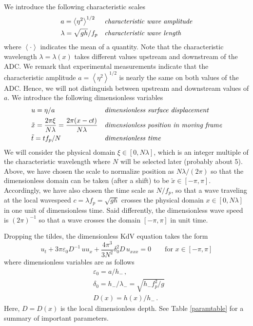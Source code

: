 \documentclass[11pt]{article}
\newcommand{\mean}[1]{\left< #1 \right>}
\newcommand{\eps}{\varepsilon}
\newcommand{\depth}{h}
\newcommand{\dup}{\depth_{-}}
\newcommand{\freqp}{f_p}
\newcommand{\lam}{\lambda}
\newcommand{\lamup}{\lam_{-}}
\newcommand{\lamfac}{N}
\newcommand{\amp}{a}
\newcommand{\epsup}{\eps_0}
\newcommand{\delup}{\delta_0}
\newcommand{\drat}{D}
\begin{document}
We introduce the following characteristic scales
\begin{align}
\label{ampdefn}
&\amp = \mean{\eta^2}^{1/2} 
&&\mbox{\em characteristic wave amplitude} \\
\label{lamdefn}
&\lam = \sqrt{g \depth} / \freqp
&&\mbox{\em characteristic wave length}
\end{align}
where $\mean{\cdot}$ indicates the mean of a quantity. Note that the characteristic wavelength $\lam = \lam(x)$ takes different values upstream and downstream of the ADC. We remark that experimental measurements indicate that the characteristic amplitude $\amp = \mean{\eta^2}^{1/2}$ is nearly the same on both values of the ADC. Hence, we will not distinguish between upstream and downstream values of $\amp$.
We introduce the following dimensionless variables
\begin{align}
&u = \eta/\amp
&&\mbox{\em dimensionless surface displacement} \\
&\tilde{x} = \frac{2 \pi \xi}{\lamfac \lam} = \frac{2 \pi (x-ct)}{\lamfac \lam}
&&\mbox{\em dimensionless position in moving frame} \\
& \tilde{t} = t \freqp / \lamfac
&&\mbox{\em dimensionless time} \\
\end{align}
We will consider the physical domain $\xi \in [0, \lamfac \lam]$, which is an integer multiple of the characteristic wavelength where $\lamfac$ will be selected later (probably about 5). Above, we have chosen the scale to normalize position as $\lamfac \lam/(2\pi)$ so that the dimensionless domain can be taken (after a shift) to be $\tilde{x} \in [-\pi,\pi]$. Accordingly, we have also chosen the time scale as $\lamfac/\freqp$, so that a wave traveling at the local wavespeed $c = \lam \freqp = \sqrt{g \depth}$ crosses the physical domain $x \in [0, \lamfac \lam]$ in one unit of dimensionless time. Said differently, the dimensionless wave speed is $(2 \pi)^{-1}$ so that a wave crosses the domain $[-\pi,\pi]$ in unit time.

Dropping the tildes, the dimensionless KdV equation takes the form
\begin{equation}
\label{dimlessKdV}
u_t + {3 \pi} \epsup \drat^{-1} \, u u_x + \frac{4 \pi^3}{3 \lamfac^2} \delup^2 \drat \, u_{xxx} = 0
\qquad \text{for } x \in [-\pi,\pi]
\end{equation}
where dimensionless variables are as follows
\begin{align}
&\epsup = \amp/\dup \, , \\
&\delup = \dup/\lamup = \sqrt{\dup \freqp^2/g} \, \\
&\drat(x) = {\depth(x)}/{\dup} \, .
\end{align}
Here, $\drat = \drat(x)$ is the local dimensionless depth. See Table \ref{paramtable} for a summary of important parameters.
\end{document}
